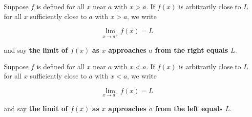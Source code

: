 \documentclass[cal1spr16Lectures.tex]{subfiles}
\begin{document}
\begin{frame}\footnotesize
\begin{dfn} Suppose $f$ is defined for all $x$ near $a$ with $x>a$.  If $f(x)$ is arbitrarily close to $L$ for all $x$ sufficiently close to $a$ with $x>a$, we write

\vspace{-0.5pc}
\[\lim_{x \to a^+} f(x)=L\]

\vspace{-0.25pc}
and say {\bf the limit of $f(x)$ as $x$ approaches $a$ from the right equals $L$}. \end{dfn}

\begin{dfn} Suppose $f$ is defined for all $x$ near $a$ with $x<a$.  If $f(x)$ is arbitrarily close to $L$ for all $x$ sufficiently close to $a$ with $x<a$, we write

\vspace{-0.5pc}
\[\lim_{x \to a^-} f(x)=L\]

\vspace{-0.25pc}
and say {\bf the limit of $f(x)$ as $x$ approaches $a$ from the left equals $L$}. \end{dfn}
\end{frame}
\end{document}
